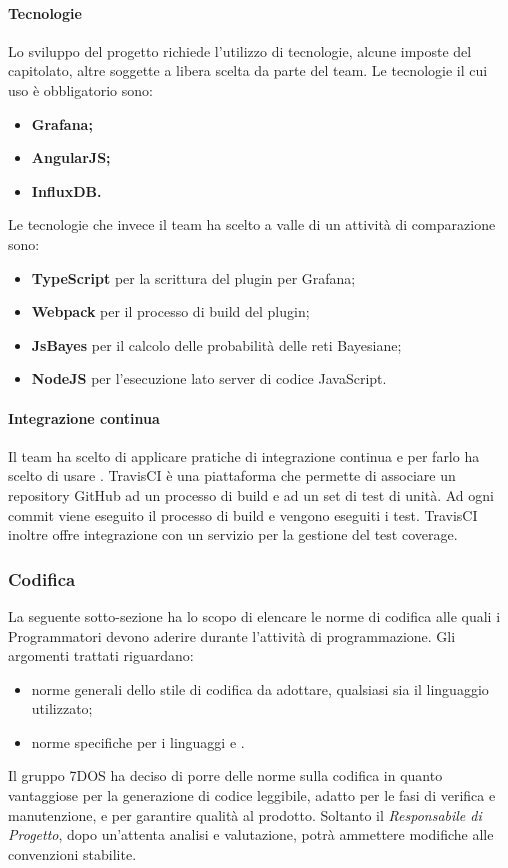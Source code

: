 \paragraph{Tecnologie}\Spazio
Lo sviluppo del progetto richiede l'utilizzo di tecnologie, alcune imposte del capitolato, altre soggette a libera scelta da parte del team.
Le tecnologie il cui uso è obbligatorio sono:
\begin{itemize}
\item\textbf{{Grafana;}}
\item\textbf{{AngularJS;}}
\item\textbf{{InfluxDB.}}
\end{itemize}
Le tecnologie che invece il team ha scelto a valle di un attività di comparazione sono:
\begin{itemize}
\item\textbf{{TypeScript}} per la scrittura del plugin per Grafana;
\item\textbf{{Webpack}} per il processo di build del plugin;
\item\textbf{{JsBayes}} per il calcolo delle probabilità delle reti Bayesiane;
\item\textbf{{NodeJS}} per l'esecuzione lato server di codice JavaScript.
\end{itemize}
\paragraph{Integrazione continua}\Spazio
Il team ha scelto di applicare pratiche di integrazione continua e per farlo ha scelto di usare .
TravisCI è una piattaforma che permette di associare un repository GitHub ad un processo di build e ad un set di test di unità.
Ad ogni commit viene eseguito il processo di build e vengono eseguiti i test. TravisCI inoltre offre integrazione con  un
servizio per la gestione del test coverage.
\subsubsection{Codifica}
La seguente sotto-sezione ha lo scopo di elencare le norme di codifica alle quali i Programmatori devono aderire durante l'attività di programmazione. Gli argomenti trattati riguardano:
\begin{itemize}
 \item{norme generali dello stile di codifica da adottare, qualsiasi sia il linguaggio utilizzato;}
 \item{norme specifiche per i linguaggi    e .}
\end{itemize}
Il gruppo 7DOS ha deciso di porre delle norme sulla codifica in quanto vantaggiose per la generazione di codice leggibile, adatto per le fasi di verifica e manutenzione, e per garantire qualità al prodotto.
Soltanto il \emph{Responsabile di Progetto}, dopo un'attenta analisi e valutazione, potrà ammettere modifiche alle convenzioni stabilite.\\
